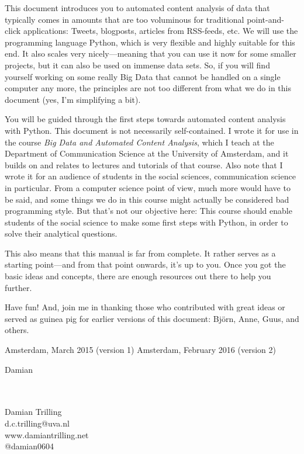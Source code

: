 \documentclass[a4paper,12pt]{book}
\begin{document}
This document introduces you to automated content analysis of data that typically comes in amounts that are too voluminous for traditional point-and-click applications: Tweets, blogposts, articles from RSS-feeds, etc. We will use the programming language Python, which is very flexible and highly suitable for this end. It also scales very nicely---meaning that you can use it now for some smaller projects, but it can also be used on immense data sets. So, if you will find yourself working on some really Big Data that cannot be handled on a single computer any more, the principles are not too different from what we do in this document (yes, I'm simplifying a bit).

You will be guided through the first steps towards automated content analysis with Python. This document is not necessarily self-contained. I wrote it for use in the course \emph{Big Data and Automated Content Analysis}, which I teach at the Department of Communication Science at the University of Amsterdam, and it builds on and relates to lectures and tutorials of that course. Also note that I wrote it for an audience of students in the social sciences, communication science in particular. From a computer science point of view, much more would have to be said, and some things we do in this course might actually be considered bad programming style. But that's not our objective here: This course should enable students of the social science to make some first steps with Python, in order to solve their analytical questions.

This also means that this manual is far from complete. It rather serves as a starting point---and from that point onwards, it's up to you. Once you got the basic ideas and concepts, there are enough resources out there to help you further.

Have fun! And, join me in thanking those who contributed with great ideas or served as guinea pig for earlier versions of this document: Björn, Anne, Guus, and others. 

\vspace{.5cm}

\begin{flushright}
Amsterdam, March 2015 (version 1)
Amsterdam, February 2016 (version 2)
\end{flushright}

Damian



\begin{flushright}
~\\~\\Damian Trilling\\
d.c.trilling@uva.nl\\
www.damiantrilling.net\\
@damian0604

\end{flushright}
\end{document}

